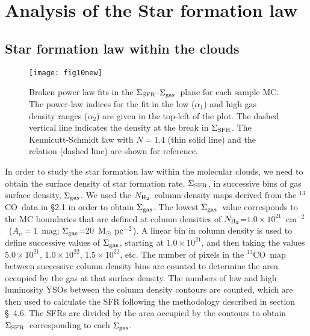 \documentclass[iop]{emulateapj}
\newcommand{\msunpc}{M$_{\odot}~{\rm pc}^{-2}$}
\newcommand{\sigsfr}{$\Sigma_{\rm SFR}$}
\newcommand{\siggas}{$\Sigma_{\rm gas}$}
\newcommand{\co}{$^{13}$CO}
\newcommand{\cmsq}{cm$^{-2}$}
\newcommand{\nhtwo}{$N_{{\rm H}_2}$}
\begin{document}
\section{Analysis of the Star formation law} 


\subsection{Star formation law within the clouds}


\begin{figure*}[ht!]
     \begin{center}
            \texttt{[image: fig10new]}
    \end{center}
\caption{
Broken power law fits in the \sigsfr-\siggas~plane for each sample MC.
The power-law indices for the fit in the low ($\alpha_{1}$) and high gas 
density ranges ($\alpha_{2}$) are given in the top-left of the plot. The 
dashed vertical line indicates the density at the break
in \sigsfr. The Kennicutt-Schmidt law with $N=1.4$ (thin solid line) and 
the \citet{wu+05} relation (dashed line) are shown for reference.
}
   \label{figure10}
\end{figure*}


In order to study the star formation law within the molecular clouds, we 
need to obtain the surface density of star formation rate, \sigsfr, in successive
bins of gas surface density, \siggas. We used the \nhtwo\ column density maps 
derived from the \co\ data in \S2.1 in order to obtain \siggas.
The lowest \siggas\ value corresponds to the MC boundaries that are defined at column 
densities of \nhtwo=$1.0\times10^{21}$~\cmsq\ ($A_v=1$~mag; \siggas=20~\msunpc). 
A linear bin in column density is used to define
successive values of \siggas, starting at $1.0\times10^{21}$, and then taking the values 
$5.0\times10^{21}$, $1.0\times10^{22}$, $1.5\times10^{22}$, etc. 
The number of pixels in the \co\ map between 
successive column density bins are counted to determine the area occupied by the
gas at that surface density. The numbers of low and high luminosity YSOs between 
the column density contours are counted, which are then used to calculate the SFR 
following the methodology described in section \S~4.6.
The SFRs are divided by the area occupied by the contours to obtain \sigsfr\
corresponding to each \siggas. 
\end{document}

